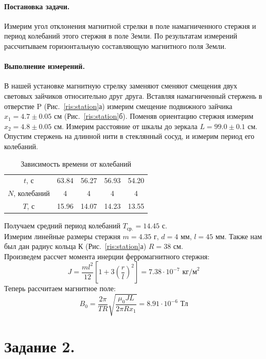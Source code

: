 \documentclass[a4paper, 12pt]{article}
\begin{document}
	\paragraph{Постановка задачи.} Измерим угол отклонения магнитной стрелки в поле намагниченного стержня и период колебаний этого стержня в поле Земли. По результатам измерений рассчитываем горизонтальную составляющую магнитного поля Земли.
	\paragraph{Выполнение измерений.} В нашей установке магнитную стрелку заменяют сменяют смещения двух световых зайчиков относительно друг друга. Вставляя намагниченный стержень в отверстие P (Рис.~\ref{ris:station}а) измерим смещение подвижного зайчика $x_1=4.7\pm0.05$ см (Рис.~\ref{ris:station}б). Поменяв ориентацию стержня измерим $x_2=4.8\pm0.05$ см. Измерим расстояние от шкалы до зеркала $L=99.0\pm0.1$ см.\\
	Опустим стержень на длинной нити в стеклянный сосуд, и измерим период его колебаний.
	\begin{table}[H]
		\centering
		\caption{Зависимость времени от колебаний}
		\begin{tabular}{c|cccc}
			\toprule
			$t$, с & 63.84 &  56.27 & 56.93 & 54.20    \\
			$N$, колебаний & 4 & 4 & 4 &  4      \\ \midrule
			$T$, с & 15.96 & 14.07 & 14.23 & 13.55 \\ \bottomrule
		\end{tabular}
	\end{table}
	Получаем средний период колебаний $T_\text{ср.} = 14.45\text{ с}$.\\
	Измерим линейные размеры стержня $m = 4.35\text{ г}$, $d=4\text{ мм}$, $l=45\text{ мм}$. Также нам был дан радиус кольца К (Рис.~\ref{ris:station}а) $R=38\text{ см}$.\\ 
	Произведем рассчет момента инерции ферромагнитного стержня: $$J=\dfrac{ml^2}{12}\left[1+3\left(\dfrac{r}{l}\right)^2\right]=7.38 \cdot 10^{-7}\text{ кг/м}^2$$ Теперь рассчитаем магнитное поле: $$B_0=\dfrac{2\pi}{TR}\sqrt{\dfrac{\mu_0JL}{2\pi Rx_1}}=8.91\cdot 10^{-6} \text{ Тл}$$
	
	\section*{Задание 2.}
\end{document}
